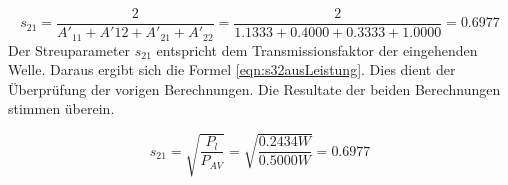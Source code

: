 \begin{equation}\label{eqn:s21ausA}
	s_{21} = \frac{2}{A'_{11}+A'{12}+A'_{21}+A'_{22}}
	=
	\frac{2}{1.1333+0.4000+0.3333+1.0000}
	= 0.6977
\end{equation}
Der Streuparameter $s_{21}$ entspricht dem Transmissionsfaktor der eingehenden Welle. Daraus ergibt sich die Formel \ref{eqn:s32ausLeistung}. Dies dient der Überprüfung der vorigen Berechnungen. Die Resultate der beiden Berechnungen stimmen überein.

\begin{equation} \label{eqn:s32ausLeistung}
	s_{21} = \sqrt{ \frac {P_l}{P_{AV}}} = \sqrt{ \frac{0.2434W} {0.5000W}} = 0.6977
\end{equation}

\bigskip
